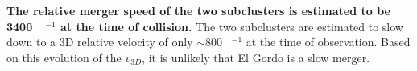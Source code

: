 \textbf{The relative merger speed of the two subclusters is estimated to be 3400~\kilo\meter~\second$^{-1}$
at the time of collision.} The two subclusters are estimated to slow down
to a 3D relative velocity of only $\sim800$ \kilo\meter~\second$^{-1}$ 
at the time of observation. Based on this evolution of the $v_{3D}$, it is
unlikely that El Gordo is a slow merger. 
